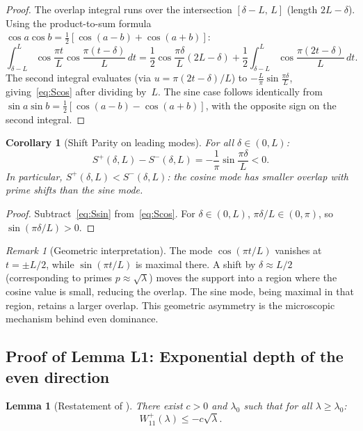 \documentclass[12pt,a4paper]{article}
\newtheorem{lemma}[theorem]{Lemma}
\newtheorem{corollary}[theorem]{Corollary}
\theoremstyle{definition}
\theoremstyle{remark}
\newtheorem{remark}[theorem]{Remark}
\begin{document}
\begin{proof}
The overlap integral runs over the intersection $[\delta - L,\,L]$ (length $2L - \delta$). Using the product-to-sum formula $\cos a\cos b = \tfrac{1}{2}[\cos(a-b) + \cos(a+b)]$:
\[
  \int_{\delta-L}^{L} \cos\frac{\pi t}{L}\cos\frac{\pi(t-\delta)}{L}\,dt
  = \frac{1}{2}\cos\frac{\pi\delta}{L}(2L - \delta) + \frac{1}{2}\int_{\delta-L}^{L}\cos\frac{\pi(2t-\delta)}{L}\,dt.
\]
The second integral evaluates (via $u = \pi(2t-\delta)/L$) to $-\frac{L}{\pi}\sin\frac{\pi\delta}{L}$, giving~\eqref{eq:Scos} after dividing by~$L$. The sine case follows identically from $\sin a\sin b = \tfrac{1}{2}[\cos(a-b) - \cos(a+b)]$, with the opposite sign on the second integral.
\end{proof}

\begin{corollary}[Shift Parity on leading modes]
\label{cor:diagonal-parity}
For all $\delta \in (0, L)$:
\begin{equation}
\label{eq:parity-diff}
  S^+(\delta, L) - S^-(\delta, L) = -\frac{1}{\pi}\sin\frac{\pi\delta}{L} < 0.
\end{equation}
In particular, $S^+(\delta, L) < S^-(\delta, L)$: the cosine mode has \emph{smaller} overlap with prime shifts than the sine mode.
\end{corollary}

\begin{proof}
Subtract~\eqref{eq:Ssin} from~\eqref{eq:Scos}. For $\delta \in (0, L)$, $\pi\delta/L \in (0, \pi)$, so $\sin(\pi\delta/L) > 0$.
\end{proof}

\begin{remark}[Geometric interpretation]
The mode $\cos(\pi t/L)$ vanishes at $t = \pm L/2$, while $\sin(\pi t/L)$ is maximal there. A shift by $\delta \approx L/2$ (corresponding to primes $p \approx \sqrt{\lambda}$) moves the support into a region where the cosine value is small, reducing the overlap. The sine mode, being maximal in that region, retains a larger overlap. This geometric asymmetry is the microscopic mechanism behind even dominance.
\end{remark}

\subsection{Proof of Lemma L1: Exponential depth of the even direction}

\begin{lemma}[Restatement of ]
There exist $c > 0$ and $\lambda_0$ such that for all $\lambda \geq \lambda_0$:
\[
  W_{11}^+(\lambda) \leq -c\sqrt{\lambda}.
\]
\end{lemma}
\end{document}
